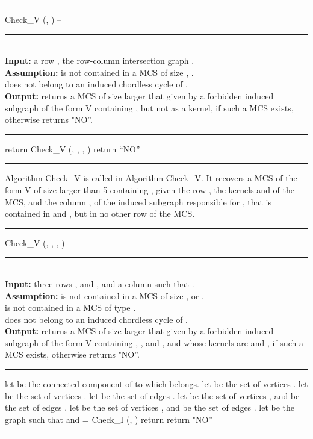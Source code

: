 \documentclass{article}
\begin{document}
\begin{algorithm}[htpb]                      
\rule{11.7cm}{0.01cm}
\caption{Check\_V (, ) -- } 
\rule{11.7cm}{0.01cm}
\\
{\bf Input:} a row , the row-column intersection graph .\\
{\bf Assumption:}   is not contained in a MCS of size , .\\
 does not belong to an induced chordless cycle of .\\
{\bf Output:} returns a MCS  of size larger that  given by a 
forbidden induced subgraph of the form V containing , but not as a kernel,
if such a MCS exists, otherwise returns  "NO''.
\rule{11.7cm}{0.01cm}
\begin{algorithmic}[1]                
\STATE return Check\_V (, , , )
\ENDFOR
\ENDFOR
\STATE return ``NO''
\end{algorithmic}
\rule{11.7cm}{0.01cm}
\end{algorithm}

Algorithm Check\_V is called in Algorithm Check\_V. It recovers a MCS
 of the form V of size larger than 5 containing , given the 
row ,  the kernels  and  of the MCS, and the column , of the 
induced subgraph responsible for , that is contained in  and 
, but in no other row of the MCS.

\begin{algorithm} [htpb]                   
\rule{11.7cm}{0.01cm}
\caption{Check\_V (, , , )-- }
\rule{11.7cm}{0.01cm}
\\
{\bf Input:} three rows ,  and , and a column  such that
  .\\
{\bf Assumption:}   is not contained in a MCS of size ,  or .\\
 is not contained in a MCS of type .\\
 does not belong to an induced chordless cycle of .\\
{\bf Output:} returns a MCS  of size larger that  given by a 
forbidden induced subgraph of the form V containing , , and , and 
whose kernels are  and , if such a MCS exists, otherwise returns  "NO''.
\rule{11.7cm}{0.01cm}
\begin{algorithmic}[1] 
\STATE 
\STATE let  be the connected component of  to which  belongs.
\STATE let  be the set of vertices .
\STATE let  be the set of vertices .
\STATE let  be the set of edges .
\STATE let  be the set of vertices  , and  be the set of edges .
\STATE let  be the set of vertices  , and  be the set of edges .
\STATE let  be the graph such that  and  
\STATE  =  Check\_I (, )
\STATE return 
\ENDIF
\STATE return "NO''
\end{algorithmic}
\rule{11.7cm}{0.01cm}
\end{algorithm}
\end{document}
